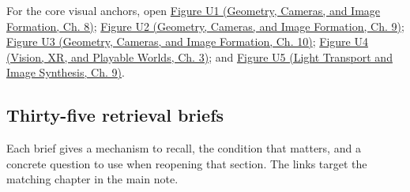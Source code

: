 For the core visual anchors, open \href{../03-Geometry-Cameras-and-Image-Formation/main.pdf\#nameddest=03-visual-computing-i-ch001-figure-u1---linear-maps-separate-directions-stretches-and-output-placement}{Figure U1 (Geometry, Cameras, and Image Formation, Ch. 8)}; \href{../03-Geometry-Cameras-and-Image-Formation/main.pdf\#nameddest=03-visual-computing-i-ch002-figure-u2---a-half-edge-separates-face-traversal-from-edge-traversal}{Figure U2 (Geometry, Cameras, and Image Formation, Ch. 9)}; \href{../03-Geometry-Cameras-and-Image-Formation/main.pdf\#nameddest=03-visual-computing-i-ch003-figure-u3---two-signals-can-share-the-same-samples}{Figure U3 (Geometry, Cameras, and Image Formation, Ch. 10)}; \href{../07-Vision-XR-and-Playable-Worlds/main.pdf\#nameddest=04-visual-computing-ii-ch032-figure-u4---lighting-rank-determines-which-normal-components-can-be-measured}{Figure U4 (Vision, XR, and Playable Worlds, Ch. 3)}; and \href{../04-Light-Transport-and-Image-Synthesis/main.pdf\#nameddest=04-visual-computing-ii-ch035-figure-u5---a-direct-light-renderer-makes-the-pipeline-executable}{Figure U5 (Light Transport and Image Synthesis, Ch. 9)}.

\subsection{Thirty-five retrieval briefs}\label{appendix-a8f634b076b5-thirty-five-retrieval-briefs}

Each brief gives a mechanism to recall, the condition that matters, and a concrete question to use when reopening that section. The links target the matching chapter in the main note.

